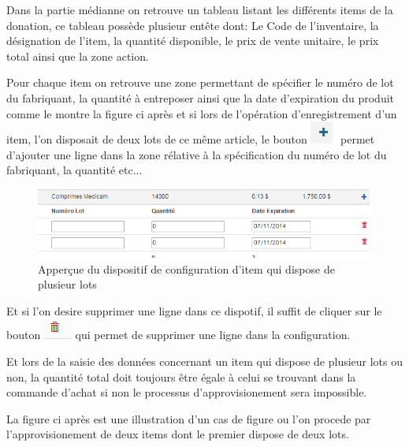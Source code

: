 \documentclass[12pt,a4paper]{report}
\begin{document}
Dans la partie médianne on retrouve un tableau listant les différents items de la donation, ce tableau possède plusieur entête dont: Le Code de l'inventaire, la désignation de l'item,  la quantité disponible, le prix de vente unitaire, le prix total ainsi que la zone action.

Pour chaque item on retrouve une zone permettant de spécifier le numéro de lot du fabriquant, la quantité à entreposer ainsi que la date d'expiration du produit comme le montre la figure ci après et si lors de l'opération d'enregistrement d'un item, l'on disposait de deux lots de ce même article, le bouton \includegraphics[scale=0.7]{pic/PlusGray.png} permet d'ajouter une ligne dans la zone rélative à la spécification du numéro de lot du fabriquant, la quantité etc...

\begin{figure}[h]
\begin{center}
\includegraphics[width=12cm]{pic/ForAddPlus.png}
\end{center}
\caption{Apperçue du dispositif de configuration d'item qui dispose de plusieur lots}
\label{Apperçue du dispositif de configuration d'item qui dispose de plusieur lots}
\end{figure}

Et si l'on desire supprimer une ligne dans ce dispotif, il suffit de cliquer sur le bouton \includegraphics[scale=0.7]{pic/DeleteWRed.png} qui permet de supprimer une ligne dans la configuration.

Et lors de la saisie des données concernant un item qui dispose de plusieur lots ou non, la quantité total doit toujours être égale à celui se trouvant dans la commande d'achat si non le processus d'approvisionement sera impossible.

La figure ci après est une illustration d'un cas de figure ou l'on procede par l'approvisionement de deux items dont le premier dispose de deux lots.
\end{document}
